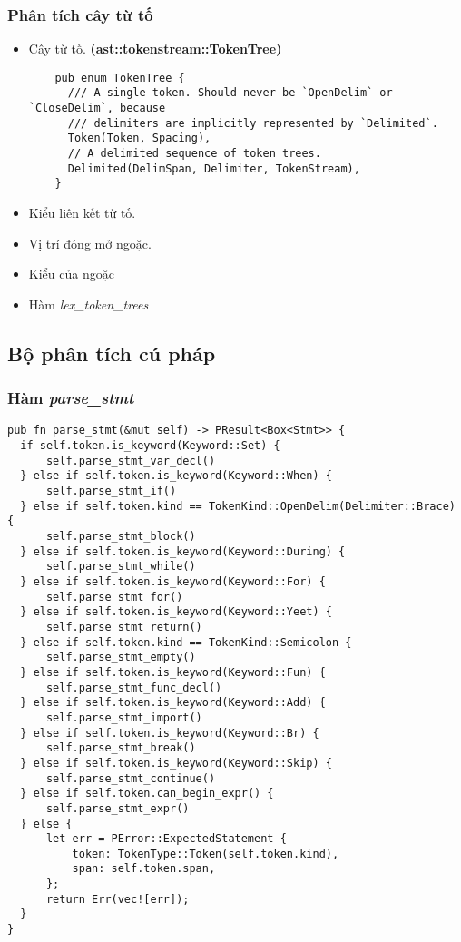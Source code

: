 {\subsubsection{Phân tích cây từ tố}
\begin{itemize}
  \item \label{ap1:tokentree}Cây từ tố. \textbf{(ast::tokenstream::TokenTree)}
  \begin{lstlisting}
    pub enum TokenTree {
      /// A single token. Should never be `OpenDelim` or `CloseDelim`, because
      /// delimiters are implicitly represented by `Delimited`.
      Token(Token, Spacing),
      // A delimited sequence of token trees.
      Delimited(DelimSpan, Delimiter, TokenStream),
    }
  \end{lstlisting}
  \item Kiểu liên kết từ tố.
  \item Vị trí đóng mở ngoặc.
  \item Kiểu của ngoặc
  \item Hàm \textit{lex\_token\_trees}
\end{itemize}

\subsection{Bộ phân tích cú pháp}
\subsubsection{Hàm \textit{parse\_stmt}}
\label{ap1:stmt}
\begin{lstlisting}
pub fn parse_stmt(&mut self) -> PResult<Box<Stmt>> {
  if self.token.is_keyword(Keyword::Set) {
      self.parse_stmt_var_decl()
  } else if self.token.is_keyword(Keyword::When) {
      self.parse_stmt_if()
  } else if self.token.kind == TokenKind::OpenDelim(Delimiter::Brace) {
      self.parse_stmt_block()
  } else if self.token.is_keyword(Keyword::During) {
      self.parse_stmt_while()
  } else if self.token.is_keyword(Keyword::For) {
      self.parse_stmt_for()
  } else if self.token.is_keyword(Keyword::Yeet) {
      self.parse_stmt_return()
  } else if self.token.kind == TokenKind::Semicolon {
      self.parse_stmt_empty()
  } else if self.token.is_keyword(Keyword::Fun) {
      self.parse_stmt_func_decl()
  } else if self.token.is_keyword(Keyword::Add) {
      self.parse_stmt_import()
  } else if self.token.is_keyword(Keyword::Br) {
      self.parse_stmt_break()
  } else if self.token.is_keyword(Keyword::Skip) {
      self.parse_stmt_continue()
  } else if self.token.can_begin_expr() {
      self.parse_stmt_expr()
  } else {
      let err = PError::ExpectedStatement {
          token: TokenType::Token(self.token.kind),
          span: self.token.span,
      };
      return Err(vec![err]);
  }
}
\end{lstlisting}

}
